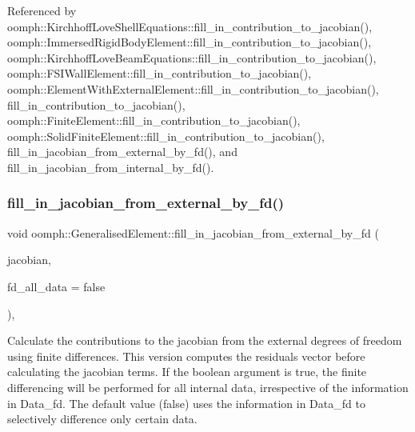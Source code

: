 Referenced by oomph\+::\+Kirchhoff\+Love\+Shell\+Equations\+::fill\+\_\+in\+\_\+contribution\+\_\+to\+\_\+jacobian(), oomph\+::\+Immersed\+Rigid\+Body\+Element\+::fill\+\_\+in\+\_\+contribution\+\_\+to\+\_\+jacobian(), oomph\+::\+Kirchhoff\+Love\+Beam\+Equations\+::fill\+\_\+in\+\_\+contribution\+\_\+to\+\_\+jacobian(), oomph\+::\+F\+S\+I\+Wall\+Element\+::fill\+\_\+in\+\_\+contribution\+\_\+to\+\_\+jacobian(), oomph\+::\+Element\+With\+External\+Element\+::fill\+\_\+in\+\_\+contribution\+\_\+to\+\_\+jacobian(), fill\+\_\+in\+\_\+contribution\+\_\+to\+\_\+jacobian(), oomph\+::\+Finite\+Element\+::fill\+\_\+in\+\_\+contribution\+\_\+to\+\_\+jacobian(), oomph\+::\+Solid\+Finite\+Element\+::fill\+\_\+in\+\_\+contribution\+\_\+to\+\_\+jacobian(), fill\+\_\+in\+\_\+jacobian\+\_\+from\+\_\+external\+\_\+by\+\_\+fd(), and fill\+\_\+in\+\_\+jacobian\+\_\+from\+\_\+internal\+\_\+by\+\_\+fd().

\mbox{\label{classoomph_1_1GeneralisedElement_a427611c389715ff4e9ea98e9d08cd93f}} 
\subsubsection{\texorpdfstring{fill\+\_\+in\+\_\+jacobian\+\_\+from\+\_\+external\+\_\+by\+\_\+fd()}{fill\_in\_jacobian\_from\_external\_by\_fd()}\hspace{0.1cm}{\footnotesize\ttfamily [2/2]}}
{\footnotesize\ttfamily void oomph\+::\+Generalised\+Element\+::fill\+\_\+in\+\_\+jacobian\+\_\+from\+\_\+external\+\_\+by\+\_\+fd (\begin{DoxyParamCaption}\item[{\hyperlink{classoomph_1_1DenseMatrix}{Dense\+Matrix}$<$ double $>$ \&}]{jacobian,  }\item[{const bool \&}]{fd\+\_\+all\+\_\+data = {\ttfamily false} }\end{DoxyParamCaption})\hspace{0.3cm}{\ttfamily [inline]}, {\ttfamily [protected]}}



Calculate the contributions to the jacobian from the external degrees of freedom using finite differences. This version computes the residuals vector before calculating the jacobian terms. If the boolean argument is true, the finite differencing will be performed for all internal data, irrespective of the information in Data\+\_\+fd. The default value (false) uses the information in Data\+\_\+fd to selectively difference only certain data. 



